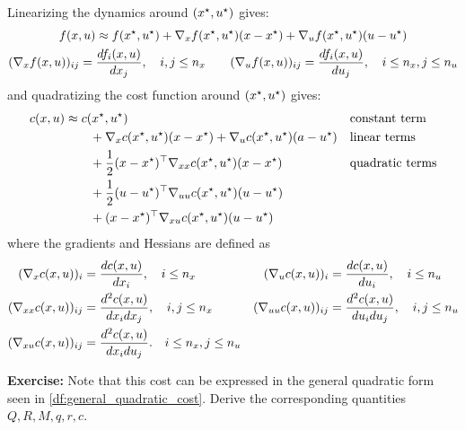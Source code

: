 \documentclass[../main/main]{subfiles}
\begin{document}
Linearizing the dynamics around $(x^\star, u^\star)$ gives:
\begin{gather*}
    f(x, u) \approx f(x^\star, u^\star) + \nabla_x f(x^\star, u^\star) (x - x^\star) + \nabla_u f(x^\star, u^\star) (u - u^\star) \\
    (\nabla_x f(x, u))_{ij} = \frac{d f_i(x, u)}{d x_j}, \quad i, j \le n_x \qquad (\nabla_u f(x, u))_{ij} = \frac{d f_i(x, u)}{d u_j}, \quad i \le n_x, j \le n_u
\end{gather*}
and quadratizing the cost function around $(x^\star, u^\star)$ gives:
\begin{align*}
    c(x, u) &\approx c(x^\star, u^\star) && \text{constant term} \\
    &\qquad + \nabla_x c(x^\star, u^\star) (x - x^\star) + \nabla_u c(x^\star, u^\star) (a - u^\star) && \text{linear terms} \\
    &\qquad + \frac{1}{2} (x - x^\star)^\top \nabla_{x x} c(x^\star, u^\star) (x - x^\star) && \text{quadratic terms} \\
    &\qquad + \frac{1}{2} (u - u^\star)^\top \nabla_{u u} c(x^\star, u^\star) (u - u^\star) \\
    &\qquad + (x - x^\star)^\top \nabla_{x u} c(x^\star, u^\star) (u - u^\star)
\end{align*}
where the gradients and Hessians are defined as
\begin{align*}
    (\nabla_x c(x, u))_{i} &= \frac{d c(x, u)}{d x_i}, \quad i \le n_x
    & (\nabla_u c(x, u))_{i} &= \frac{d c(x, u)}{d u_i}, \quad i \le n_u \\
    (\nabla_{x x} c(x, u))_{ij} &= \frac{d^2 c(x, u)}{d x_i d x_j}, \quad i, j \le n_x
    & (\nabla_{u u} c(x, u))_{ij} &= \frac{d^2 c(x, u)}{d u_i d u_j}, \quad i, j \le n_u \\
    (\nabla_{x u} c(x, u))_{ij} &= \frac{d^2 c(x, u)}{d x_i d u_j}. \quad i \le n_x, j \le n_u
\end{align*}

\textbf{Exercise:} Note that this cost can be expressed in the general quadratic form seen in \autoref{df:general_quadratic_cost}. Derive the corresponding quantities $Q, R, M, q, r, c$.
\end{document}
